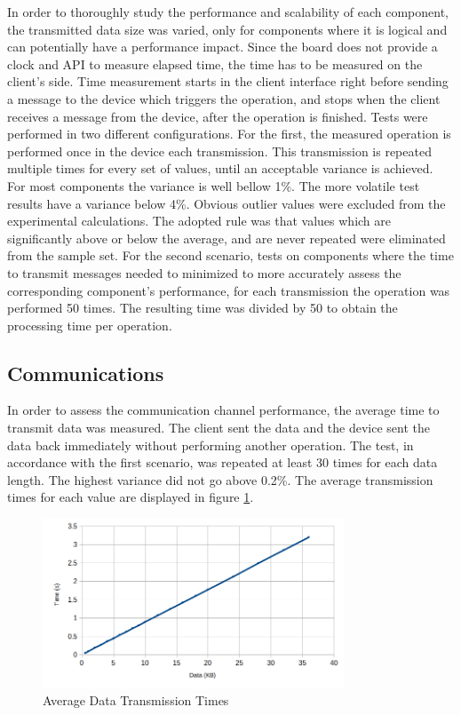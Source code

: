 In order to thoroughly study the performance and scalability of each component, the transmitted data size was varied, only for components where it is logical and can potentially have a performance impact.
Since the board does not provide a clock and \ac{API} to measure elapsed time, the time has to be measured on the client's side.
Time measurement starts in the client interface right before sending a message to the device which triggers the operation, and stops when the client receives a message from the device, after the operation is finished.
Tests were performed in two different configurations.
For the first, the measured operation is performed once in the device each transmission. This transmission is repeated multiple times for every set of values, until an acceptable variance is achieved. For most components the variance is well bellow 1\%. The more volatile test results have a variance below 4\%.
Obvious outlier values were excluded from the experimental calculations. The adopted rule was that values which are significantly above or below the average, and are never repeated were eliminated from the sample set.
For the second scenario, tests on components where the time to transmit messages needed to minimized to more accurately assess the corresponding component's performance, for each transmission the operation was performed 50 times. The resulting time was divided by 50 to obtain the processing time per operation.

\subsection{Communications}\label{chap:evaluation:performance:comms}

In order to assess the communication channel performance, the average time to transmit data was measured. The client sent the data and the device sent the data back immediately without performing another operation. The test, in accordance with the first scenario, was repeated at least 30 times for each data length. The highest variance did not go above 0.2\%.
The average transmission times for each value are displayed in figure \ref{fig:comms:time}.

\begin{figure}[h!]
	\centering
	\includegraphics[width=0.8\textwidth]{./Images/comms-time.png}
	\caption{Average Data Transmission Times}
	\label{fig:comms:time}
\end{figure}

